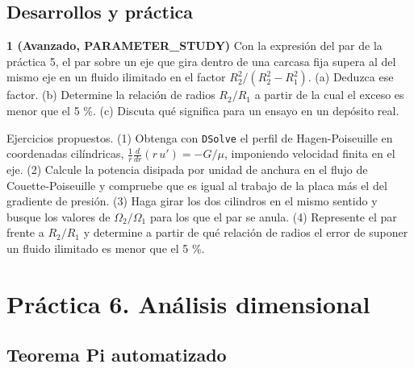 \documentclass[10pt,openany]{book}
\begin{document}
\section{Desarrollos y práctica}

\begin{tcolorbox}[title={Ejercicios propuestos}, studiumworked, breakable]

\noindent\textbf{1 (Avanzado, PARAMETER\_STUDY)}
Con la expresión del par de la práctica 5, el par sobre un eje que gira dentro de una carcasa fija supera al del mismo eje en un fluido ilimitado en el factor \(R_2^{2}/(R_2^{2} - R_1^{2})\). (a) Deduzca ese factor. (b) Determine la relación de radios \(R_2/R_1\) a partir de la cual el exceso es menor que el 5 \%. (c) Discuta qué significa para un ensayo en un depósito real.
\end{tcolorbox}

\begin{tcolorbox}[title={Autoevaluación}, studiumcheck, breakable]

Ejercicios propuestos. (1) Obtenga con \texttt{DSolve} el perfil de Hagen-Poiseuille en coordenadas cilíndricas, \(\frac{1}{r}\frac{d}{dr}(r\,u') = -G/\mu\), imponiendo velocidad finita en el eje. (2) Calcule la potencia disipada por unidad de anchura en el flujo de Couette-Poiseuille y compruebe que es igual al trabajo de la placa más el del gradiente de presión. (3) Haga girar los dos cilindros en el mismo sentido y busque los valores de \(\Omega_2/\Omega_1\) para los que el par se anula. (4) Represente el par frente a \(R_2/R_1\) y determine a partir de qué relación de radios el error de suponer un fluido ilimitado es menor que el 5 \%.
\end{tcolorbox}
\studiumchaptercheck

\chapter{Práctica 6. Análisis dimensional}
\label{chap:m06}


\section{Teorema Pi automatizado}
\end{document}
